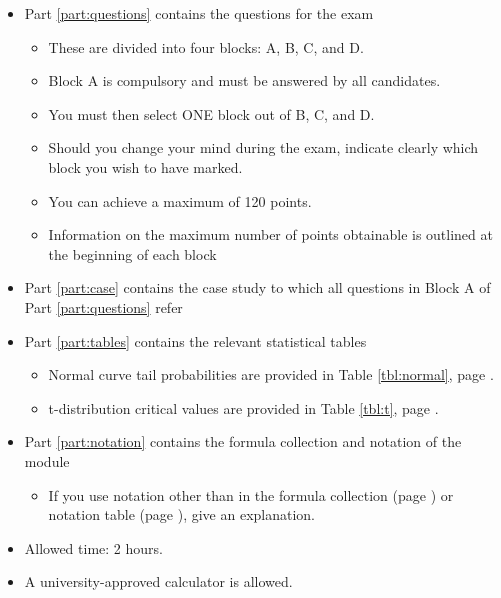 \documentclass[12pt,a4paper]{article}
\providecommand{\tightlist}{%
  \setlength{\itemsep}{0pt}\setlength{\parskip}{0pt}}
\begin{document}
\begin{itemize}
\tightlist
\item
  Part \ref{part:questions} contains the questions for the exam

  \begin{itemize}
  \tightlist
  \item
    These are divided into four blocks: A, B, C, and D.
  \item
    Block A is compulsory and must be answered by all candidates.
  \item
    You must then select ONE block out of B, C, and D.
  \item
    Should you change your mind during the exam, indicate clearly which
    block you wish to have marked.
  \item
    You can achieve a maximum of 120 points.
  \item
    Information on the maximum number of points obtainable is outlined
    at the beginning of each block
  \end{itemize}
\item
  Part \ref{part:case} contains the case study to which all questions in
  Block A of Part \ref{part:questions} refer
\item
  Part \ref{part:tables} contains the relevant statistical tables

  \begin{itemize}
  \tightlist
  \item
    Normal curve tail probabilities are provided in Table
    \ref{tbl:normal}, page \pageref{tbl:normal}.
  \item
    t-distribution critical values are provided in Table \ref{tbl:t},
    page \pageref{tbl:t}.
  \end{itemize}
\item
  Part \ref{part:notation} contains the formula collection and notation
  of the module

  \begin{itemize}
  \tightlist
  \item
    If you use notation other than in the formula collection (page
    \pageref{tbl:formulae_po11q}) or notation table (page
    \pageref{sec:Notation}), give an explanation.
  \end{itemize}
\item
  Allowed time: 2 hours.
\item
  A university-approved calculator is allowed.
\end{itemize}

\newpage
\end{document}
